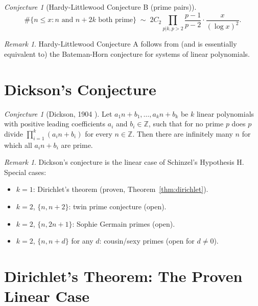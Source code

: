\documentclass[12pt,a4paper]{amsart}
\theoremstyle{definition}
\theoremstyle{remark}
\newtheorem{remark}[theorem]{Remark}
\newtheorem{conjecture}[theorem]{Conjecture}
\newcommand{\Z}{\mathbb{Z}}
\begin{document}
\begin{conjecture}[Hardy-Littlewood Conjecture B (prime pairs)]
  \[
    \#\{n \leq x : n \text{ and } n+2k \text{ both prime}\}
    \;\sim\; 2C_2 \prod_{p|k, p>2} \frac{p-1}{p-2} \cdot \frac{x}{(\log x)^2}.
  \]
\end{conjecture}

\begin{remark}
  Hardy-Littlewood Conjecture A follows from (and is essentially equivalent to) the
  Bateman-Horn conjecture for systems of linear polynomials.
\end{remark}

\section{Dickson's Conjecture}\label{sec:dickson}

\begin{conjecture}[Dickson, 1904 \cite{Dickson1904}]
  \label{conj:dickson}
  Let $a_1 n + b_1, \ldots, a_k n + b_k$ be $k$ linear polynomials with positive
  leading coefficients $a_i$ and $b_i \in \Z$, such that for no prime $p$ does $p$ divide
  $\prod_{i=1}^k (a_i n + b_i)$ for every $n \in \Z$.
  Then there are infinitely many $n$ for which all $a_i n + b_i$ are prime.
\end{conjecture}

\begin{remark}
  Dickson's conjecture is the linear case of Schinzel's Hypothesis H. Special cases:
  \begin{itemize}
    \item $k=1$: Dirichlet's theorem (proven, Theorem~\ref{thm:dirichlet}).
    \item $k=2$, $\{n, n+2\}$: twin prime conjecture (open).
    \item $k=2$, $\{n, 2n+1\}$: Sophie Germain primes (open).
    \item $k=2$, $\{n, n+d\}$ for any $d$: cousin/sexy primes (open for $d \neq 0$).
  \end{itemize}
\end{remark}

\section{Dirichlet's Theorem: The Proven Linear Case}\label{sec:dirichlet}
\end{document}
